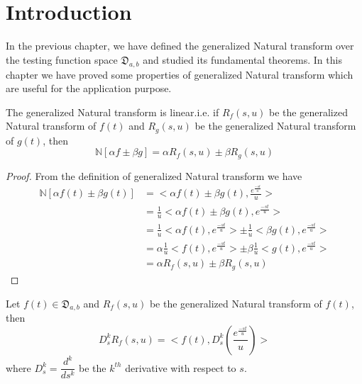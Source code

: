 \section{Introduction}
 In the previous chapter, we have defined the generalized Natural transform over the testing function space $\mathfrak{D}_{a,b}$ and studied its fundamental theorems. In this chapter we have proved some properties of generalized Natural transform which are useful for the application purpose.
\begin{theorem}
 The generalized Natural transform is linear.i.e. if $R_{f}(s,u)$ be the generalized Natural transform of $f(t)$ and $R_{g}(s,u)$ be the generalized Natural transform of $g(t)$, then
 \begin{equation}
 \mathbb{N}[\alpha f \pm \beta g]=\alpha R_{f}(s,u) \pm\beta R_{g}(s,u)
 \end{equation}
\end{theorem}
\begin{proof}
 From the definition of generalized Natural transform we have
 \begin{align*}
 \mathbb{N}[\alpha f(t) \pm \beta g(t)]&=<\alpha f(t) \pm \beta g(t),\frac{e^{\frac{-st}{u}}}{u}>\\
&=\frac{1}{u}<\alpha f(t) \pm \beta g(t),e^{\frac{-st}{u}}>\\
&=\frac{1}{u}<\alpha f(t),e^{\frac{-st}{u}}>\pm\frac{1}{u}<\beta g(t),e^{\frac{-st}{u}}>\\
&=\alpha\frac{1}{u}< f(t),e^{\frac{-st}{u}}>\pm\beta\frac{1}{u}< g(t),e^{\frac{-st}{u}}>\\
&=\alpha R_{f}(s,u)\pm\beta R_{g}(s,u)
 \end{align*}
\end{proof}
\begin{theorem}
 Let $f(t)\in \mathfrak{D}_{a,b}$ and $R_{f}(s,u)$ be the generalized Natural transform of $f(t)$, then
\begin{equation}
D_{s}^{k}R_{f}(s,u)=<f(t),D_{s}^{k}(\frac{e^{\frac{-st}{u}}}{u})>
\end{equation}
where $D_{s}^{k}=\dfrac{d^{k}}{ds^{k}}$ be the $k^{th}$ derivative with respect to $s$.
\end{theorem}
